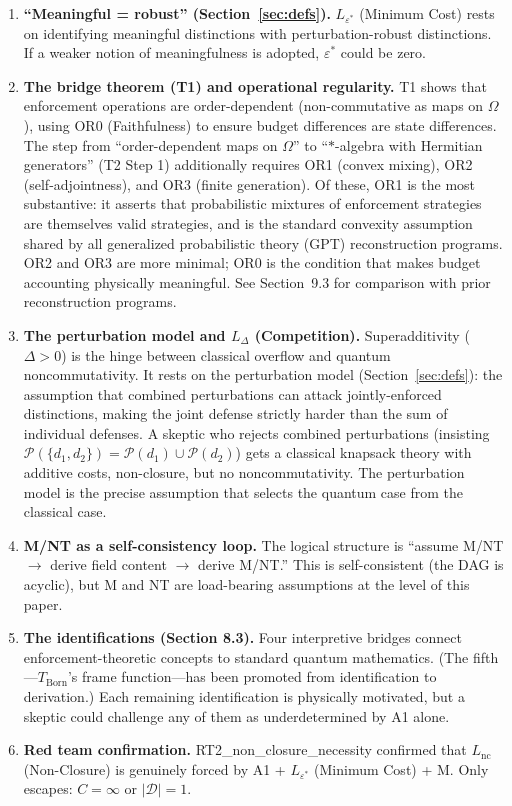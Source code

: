 \documentclass[11pt]{article}
\begin{document}
\begin{enumerate}
  \item \textbf{``Meaningful = robust'' (Section~\ref{sec:defs}).}  $L_{\varepsilon^*}$ (Minimum Cost) rests on identifying meaningful distinctions with perturbation-robust distinctions.  If a weaker notion of meaningfulness is adopted, $\varepsilon^*$ could be zero.

  \item \textbf{The bridge theorem (T1) and operational regularity.}  T1 shows that enforcement operations are order-dependent (non-commutative as maps on $\Omega$), using OR0 (Faithfulness) to ensure budget differences are state differences.  The step from ``order-dependent maps on $\Omega$'' to ``$*$-algebra with Hermitian generators'' (T2 Step 1) additionally requires OR1 (convex mixing), OR2 (self-adjointness), and OR3 (finite generation).  Of these, OR1 is the most substantive: it asserts that probabilistic mixtures of enforcement strategies are themselves valid strategies, and is the standard convexity assumption shared by all generalized probabilistic theory (GPT) reconstruction programs.  OR2 and OR3 are more minimal; OR0 is the condition that makes budget accounting physically meaningful.  See Section~9.3 for comparison with prior reconstruction programs.

  \item \textbf{The perturbation model and $L_\Delta$ (Competition).}  Superadditivity ($\Delta > 0$) is the hinge between classical overflow and quantum noncommutativity.  It rests on the perturbation model (Section~\ref{sec:defs}): the assumption that combined perturbations can attack jointly-enforced distinctions, making the joint defense strictly harder than the sum of individual defenses.  A skeptic who rejects combined perturbations (insisting $\mathcal{P}(\{d_1,d_2\}) = \mathcal{P}(d_1) \cup \mathcal{P}(d_2)$) gets a classical knapsack theory with additive costs, non-closure, but no noncommutativity.  The perturbation model is the precise assumption that selects the quantum case from the classical case.

  \item \textbf{M/NT as a self-consistency loop.}  The logical structure is ``assume M/NT $\to$ derive field content $\to$ derive M/NT.''  This is self-consistent (the DAG is acyclic), but M and NT are load-bearing assumptions at the level of this paper.

  \item \textbf{The identifications (Section 8.3).}  Four interpretive bridges connect enforcement-theoretic concepts to standard quantum mathematics.  (The fifth---$T_{\mathrm{Born}}$'s frame function---has been promoted from identification to derivation.)  Each remaining identification is physically motivated, but a skeptic could challenge any of them as underdetermined by A1 alone.

  \item \textbf{Red team confirmation.}  RT2\_non\_closure\_necessity confirmed that $L_{\mathrm{nc}}$ (Non-Closure) is genuinely forced by A1 + $L_{\varepsilon^*}$ (Minimum Cost) + M.  Only escapes: $C = \infty$ or $|\mathcal{D}| = 1$.
\end{enumerate}
\end{document}
